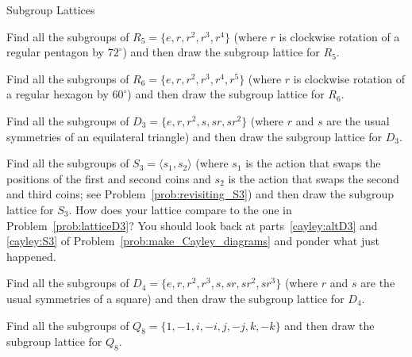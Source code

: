 \begin{section}{Subgroup Lattices}
\begin{problem}
Find all the subgroups of $R_5=\{e,r,r^2,r^3,r^4\}$ (where $r$ is clockwise rotation of a regular pentagon by $72^{\circ}$) and then draw the subgroup lattice for $R_5$.
\end{problem}

\begin{problem}
Find all the subgroups of $R_6=\{e,r,r^2,r^3,r^4,r^5\}$ (where $r$ is clockwise rotation of a regular hexagon by $60^{\circ}$) and then draw the subgroup lattice for $R_6$.
\end{problem}

\begin{problem}\label{prob:latticeD3}
Find all the subgroups of $D_3=\{e,r,r^2,s,sr,sr^2\}$ (where $r$ and $s$ are the usual symmetries of an equilateral triangle) and then draw the subgroup lattice for $D_3$.
\end{problem}

\begin{problem}
Find all the subgroups of $S_3=\langle s_1, s_2\rangle$ (where $s_1$ is the action that swaps the positions of the first and second coins and $s_2$ is the action that swaps the second and third coins; see Problem~\ref{prob:revisiting_S3}) and then draw the subgroup lattice for $S_3$. How does your lattice compare to the one in Problem~\ref{prob:latticeD3}? You should look back at parts~\ref{cayley:altD3} and \ref{cayley:S3} of Problem~\ref{prob:make_Cayley_diagrams} and ponder what just happened.
\end{problem}

\begin{problem}
Find all the subgroups of $D_4=\{e,r,r^2,r^3,s,sr,sr^2,sr^3\}$ (where $r$ and $s$ are the usual symmetries of a square) and then draw the subgroup lattice for $D_4$.
\end{problem}

\begin{problem}
Find all the subgroups of $Q_8=\{1,-1,i,-i,j,-j,k,-k\}$ and then draw the subgroup lattice for $Q_8$.
\end{problem}

\end{section}


